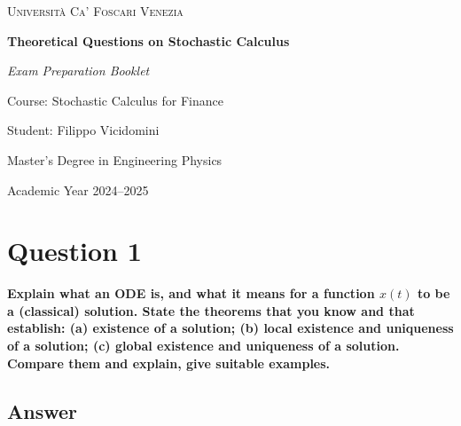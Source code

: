 \documentclass[12pt,a4paper]{book}
\theoremstyle{remark}
\begin{document}
\begin{titlepage}
    \centering
    
    {\scshape Università Ca' Foscari Venezia \par}
 
    \vspace{2cm}
    \vfill
    {\Huge\bfseries Theoretical Questions on Stochastic Calculus \par}
    \vspace{1.5cm}
    {\Large\itshape Exam Preparation Booklet\par}
    
    \vspace{2cm}
    {\Large Course: Stochastic Calculus for Finance \par}
    \vspace{0.5cm}
 
    
    \vfill
    
    {\large Student: Filippo Vicidomini \par}
    {\large Master’s Degree in Engineering Physics\par}
    
    \vfill
    
    {\large Academic Year 2024--2025 \par}
    
\end{titlepage}


\tableofcontents
\clearpage

\setcounter{page}{1}

\newpage
\section{Question 1}
\textbf{Explain what an ODE is, and what it means for a function $x(t)$ to be a (classical) solution. 
State the theorems that you know and that establish: (a) existence of a solution; (b) local existence and uniqueness of a solution; (c) global existence and uniqueness of a solution. 
Compare them and explain, give suitable examples.}

\subsection*{Answer}
\end{document}
